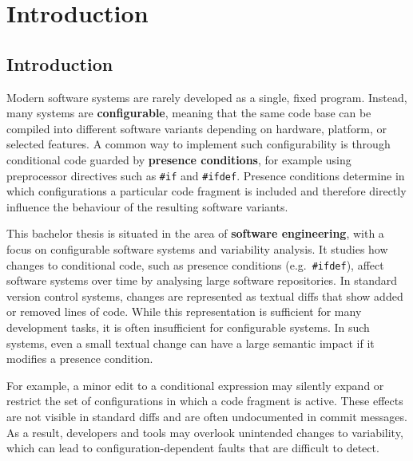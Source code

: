 \chapter{Introduction}
\label{chp:intro}


\section{Introduction}

Modern software systems are rarely developed as a single, fixed program. Instead, many systems are \textbf{configurable}, meaning that the same code base can be compiled into different software variants depending on hardware, platform, or selected features. A common way to implement such configurability is through conditional code guarded by \textbf{presence conditions}, for example using preprocessor directives such as \texttt{\#if} and \texttt{\#ifdef}. Presence conditions determine in which configurations a particular code fragment is included and therefore directly influence the behaviour of the resulting software variants.

This bachelor thesis is situated in the area of \textbf{software engineering}, with a focus on configurable software systems and variability analysis. It studies how changes to conditional code, such as presence conditions (e.g.\ \texttt{\#ifdef}), affect software systems over time by analysing large software repositories. In standard version control systems, changes are represented as textual diffs that show added or removed lines of code. While this representation is sufficient for many development tasks, it is often insufficient for configurable systems. In such systems, even a small textual change can have a large semantic impact if it modifies a presence condition.

For example, a minor edit to a conditional expression may silently expand or restrict the set of configurations in which a code fragment is active. These effects are not visible in standard diffs and are often undocumented in commit messages. As a result, developers and tools may overlook unintended changes to variability, which can lead to configuration-dependent faults that are difficult to detect.


